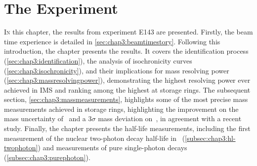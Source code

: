 
\chapter{The Experiment \Eonefourthree}\label{chap:results}
\lettrine{I}{n} this chapter, the results from experiment \textsc{E143} \cite{kortenE143} are presented. Firstly, the beam time experience is detailed in \cref{sec:chap3:beamtimestory}. Following this introduction, the chapter presents the results. It covers the identification process (\cref{sec:chap3:identification}), the analysis of isochronicity curves (\cref{sec:chap3:isochronicity}), and their implications for mass resolving power (\cref{sec:chap3:massresolvingpower}), demonstrating the highest resolving power ever achieved in \textsc{IMS} and ranking among the highest at storage rings. The subsequent section, \cref{sec:chap3:massmeasurements}, highlights some of the most precise mass measurements achieved in storage rings, highlighting the improvement on the mass uncertainty of \, and a $3\sigma$ mass deviation on \,, in agreement with a recent study. Finally, the chapter presents the half-life measurements, including the first measurement of the nuclear two-photon decay half-life in \, (\cref{subsec:chap3:hl-twophoton}) and measurements of pure single-photon decays (\cref{subsec:chap3:purephoton}).

